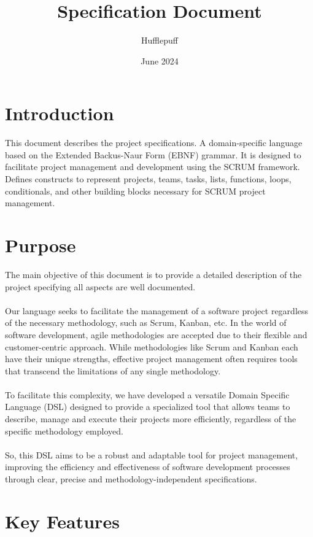 \documentclass{article}
\title{Specification Document}
\author{Hufflepuff}
\date{June 2024}
\begin{document}
\maketitle

\tableofcontents
\newpage

\section{Introduction}
\label{sec:introduction}
This document describes the project specifications. A domain-specific language based on the Extended Backus-Naur Form (EBNF) grammar. It is designed to facilitate project management and development using the SCRUM framework. Defines constructs to represent projects, teams, tasks, lists, functions, loops, conditionals, and other building blocks necessary for SCRUM project management.

\section{Purpose}
\label{sec:purpose}
The main objective of this document is to provide a detailed description of the project specifying all aspects are well documented.
\\\\
Our language seeks to facilitate the management of a software project regardless of the necessary methodology, such as Scrum, Kanban, etc. In the world of software development, agile methodologies are accepted due to their flexible and customer-centric approach. While methodologies like Scrum and Kanban each have their unique strengths, effective project management often requires tools that transcend the limitations of any single methodology.
\\\\
To facilitate this complexity, we have developed a versatile Domain Specific Language (DSL) designed to provide a specialized tool that allows teams to describe, manage and execute their projects more efficiently, regardless of the specific methodology employed. 
\\\\
So, this DSL aims to be a robust and adaptable tool for project management, improving the efficiency and effectiveness of software development processes through clear, precise and methodology-independent specifications.

\section{Key Features}
\label{sec:key-features}
\end{document}
